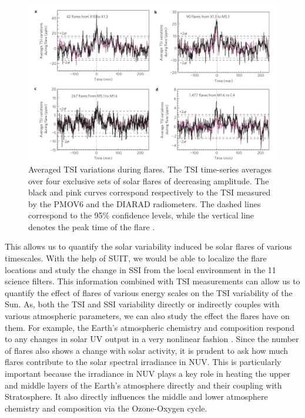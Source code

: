 \begin{figure}[h!]
    \centering
    \includegraphics[width = \linewidth]{Figures/nphys1741_page-0002.jpg}
    \caption{Averaged TSI variations during flares. The TSI time-series averages over four exclusive sets of solar flares of decreasing amplitude. The black and pink curves correspond respectively to the TSI measured by the PMOV6 and the DIARAD radiometers. The dashed lines correspond to the 95\% confidence levels, while the vertical line denotes the peak time of the flare \citep{kretzschmar10}.}
    \label{fig2}
\end{figure}

This allows us to quantify the solar variability induced be solar flares of various timescales. With the help of SUIT, we would be able to localize the flare locations and study the change in SSI from the local environment in the 11 science filters. This information combined with TSI measurements can allow us to quantify the effect of flares of various energy scales on the TSI variability of the Sun. As, both the TSI and SSI variability directly or indirectly couples with various atmospheric parameters, we can also study the effect the flares have on them. For example, the Earth's atmospheric chemistry and composition respond to any changes in solar UV output in a very nonlinear fashion \citep{haigh07}. Since the number of flares also shows a change with solar activity, it is prudent to ask how much flares contribute to the solar spectral irradiance in NUV. This is particularly important because the irradiance in NUV plays a key role in heating the upper and middle layers of the Earth's atmosphere directly and their coupling with Stratosphere. It also directly influences the middle and lower atmosphere chemistry and composition via the Ozone-Oxygen cycle.


